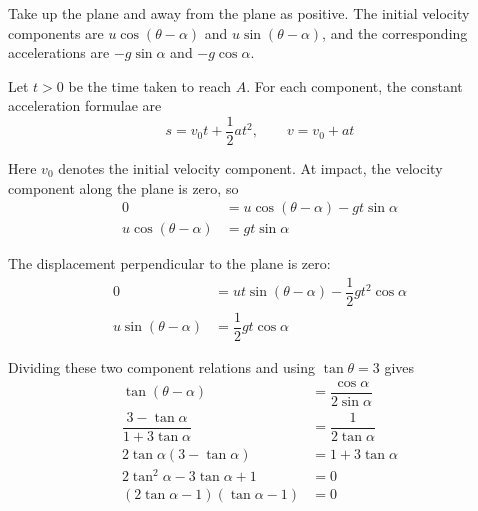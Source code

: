 \documentclass[leqno]{article}
\begin{document}
\begin{enumerate}[
  label=\textbf{\arabic*.},
  leftmargin=*,
  topsep=0pt,
  partopsep=0pt,
  parsep=0pt
]
\begin{djsSolution}
\begin{djsSolutionFigure}
\end{djsSolutionFigure}

Take up the plane and away from the plane as positive. The initial velocity components are \(u\cos(\theta-\alpha)\) and \(u\sin(\theta-\alpha)\), and the corresponding accelerations are \(-g\sin\alpha\) and \(-g\cos\alpha\).

Let \(t>0\) be the time taken to reach \(A\). For each component, the constant acceleration formulae are
\[
s=v_0t+\dfrac12at^2,\qquad v=v_0+at
\]

Here \(v_0\) denotes the initial velocity component. At impact, the velocity component along the plane is zero, so
\begin{align*}
0&=u\cos(\theta-\alpha)-gt\sin\alpha\\
u\cos(\theta-\alpha)&=gt\sin\alpha
\end{align*}

The displacement perpendicular to the plane is zero:
\begin{align*}
0&=ut\sin(\theta-\alpha)-\dfrac12gt^2\cos\alpha\\
u\sin(\theta-\alpha)&=\dfrac12gt\cos\alpha
\end{align*}

Dividing these two component relations and using \(\tan\theta=3\) gives
\begin{align*}
\tan(\theta-\alpha)&=\dfrac{\cos\alpha}{2\sin\alpha}\\
\dfrac{3-\tan\alpha}{1+3\tan\alpha}&=\dfrac{1}{2\tan\alpha}\\
2\tan\alpha(3-\tan\alpha)&=1+3\tan\alpha\\
2\tan^2\alpha-3\tan\alpha+1&=0\\
(2\tan\alpha-1)(\tan\alpha-1)&=0
\end{align*}


\end{djsSolution}
\end{enumerate}
\end{document}
